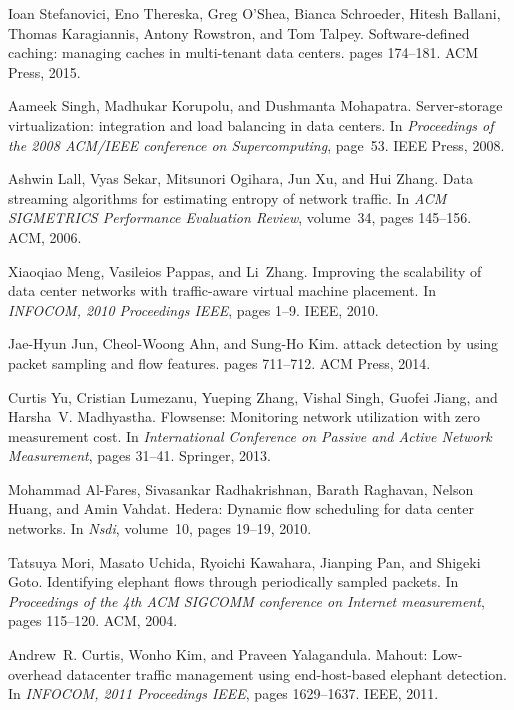 \begin{thebibliography}{10}
Ioan Stefanovici, Eno Thereska, Greg O'Shea, Bianca Schroeder, Hitesh Ballani,
  Thomas Karagiannis, Antony Rowstron, and Tom Talpey.
\newblock Software-defined caching: managing caches in multi-tenant data
  centers.
\newblock pages 174--181. ACM Press, 2015.

Aameek Singh, Madhukar Korupolu, and Dushmanta Mohapatra.
\newblock Server-storage virtualization: integration and load balancing in data
  centers.
\newblock In {\em Proceedings of the 2008 {ACM}/{IEEE} conference on
  {Supercomputing}}, page~53. IEEE Press, 2008.

Ashwin Lall, Vyas Sekar, Mitsunori Ogihara, Jun Xu, and Hui Zhang.
\newblock Data streaming algorithms for estimating entropy of network traffic.
\newblock In {\em {ACM} {SIGMETRICS} {Performance} {Evaluation} {Review}},
  volume~34, pages 145--156. ACM, 2006.

Xiaoqiao Meng, Vasileios Pappas, and Li~Zhang.
\newblock Improving the scalability of data center networks with traffic-aware
  virtual machine placement.
\newblock In {\em {INFOCOM}, 2010 {Proceedings} {IEEE}}, pages 1--9. IEEE,
  2010.

Jae-Hyun Jun, Cheol-Woong Ahn, and Sung-Ho Kim.
 attack detection by using packet sampling and flow features.
\newblock pages 711--712. ACM Press, 2014.

Curtis Yu, Cristian Lumezanu, Yueping Zhang, Vishal Singh, Guofei Jiang, and
  Harsha~V. Madhyastha.
\newblock Flowsense: {Monitoring} network utilization with zero measurement
  cost.
\newblock In {\em International {Conference} on {Passive} and {Active}
  {Network} {Measurement}}, pages 31--41. Springer, 2013.

Mohammad Al-Fares, Sivasankar Radhakrishnan, Barath Raghavan, Nelson Huang, and
  Amin Vahdat.
\newblock Hedera: {Dynamic} flow scheduling for data center networks.
\newblock In {\em Nsdi}, volume~10, pages 19--19, 2010.

Tatsuya Mori, Masato Uchida, Ryoichi Kawahara, Jianping Pan, and Shigeki Goto.
\newblock Identifying elephant flows through periodically sampled packets.
\newblock In {\em Proceedings of the 4th {ACM} {SIGCOMM} conference on
  {Internet} measurement}, pages 115--120. ACM, 2004.

Andrew~R. Curtis, Wonho Kim, and Praveen Yalagandula.
\newblock Mahout: {Low}-overhead datacenter traffic management using
  end-host-based elephant detection.
\newblock In {\em {INFOCOM}, 2011 {Proceedings} {IEEE}}, pages 1629--1637.
  IEEE, 2011.


\end{thebibliography}
